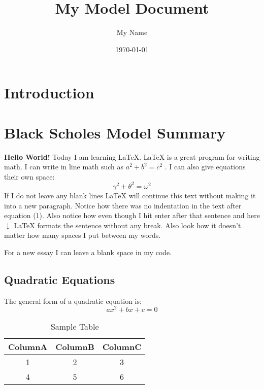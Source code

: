 \documentclass{article} %
\title{My Model Document} %
\author{My Name} %
\date{\today} %
\begin{document}
\maketitle %

\section{Introduction} %



\section{Black Scholes Model Summary} %



\textbf{Hello World!} Today I am learning \LaTeX. %
\LaTeX{} is a great program for writing math. I can write in line math such as $a^2+b^2=c^2$ %
. I can also give equations their own space:
\begin{equation} %
  \gamma^2+\theta^2=\omega^2
\end{equation}
If I do not leave any blank lines \LaTeX{} will continue  this text without making it into a new paragraph.  Notice how there was no indentation in the text after equation (1).
Also notice how even though I hit enter after that sentence and here $\downarrow$
\LaTeX{} formats the sentence without any break.  Also   look  how      it   doesn't     matter          how    many  spaces     I put     between       my    words.

For a new essay I can leave a blank space in my code.

\subsection{Quadratic Equations}

The general form of a quadratic equation is:
\begin{equation}
ax^2 + bx + c = 0
\end{equation}
\begin{table}[h!]
\centering
\begin{tabular}{|c|c|c|}
\hline
\textbf{ColumnA} & \textbf{ColumnB} & \textbf{ColumnC} \\
\hline
1 & 2 & 3 \\
\hline
4 & 5 & 6 \\
\hline
\end{tabular}
\caption{Sample Table}
\label{table:1}
\end{table}
\end{document}
